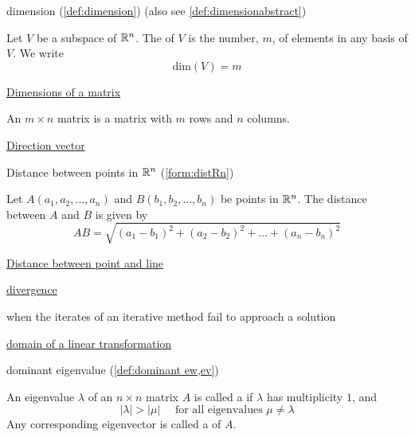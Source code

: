 \documentclass{ximera}
\begin{document}
dimension (\ref{def:dimension}) (also see \ref{def:dimensionabstract})
\begin{expandable}
    Let $V$ be a subspace of $\mathbb{R}^n$.  The  of $V$ is the number, $m$, of elements in any basis of $V$.  We write
$$\mbox{dim}(V)=m$$
\end{expandable}

\href{https://ximera.osu.edu/oerlinalg/LinearAlgebra/RRN-0010/main}{Dimensions of a matrix}
\begin{expandable}
    An $m \times n$ matrix is a matrix with $m$ rows and $n$ columns.
\end{expandable}

\href{https://ximera.osu.edu/oerlinalg/LinearAlgebra/RRN-0020/main}{Direction vector}

Distance between points in $\mathbb{R}^n$ (\ref{form:distRn})
\begin{expandable}
Let $A(a_1, a_2,\ldots ,a_n)$ and $B(b_1, b_2,\ldots ,b_n)$ be points in $\mathbb{R}^n$.  The distance between $A$ and $B$ is given by
$$AB=\sqrt{(a_1-b_1)^2+(a_2-b_2)^2+\ldots +(a_n-b_n)^2}$$
\end{expandable}

\href{https://ximera.osu.edu/oerlinalg/LinearAlgebra/VEC-0070/main}{Distance between point and line}

\href{https://ximera.osu.edu/oerlinalg/LinearAlgebra/SYS-0040/main}{divergence}
\begin{expandable}
    when the iterates of an iterative method fail to approach a solution
\end{expandable}

\href{https://ximera.osu.edu/oerlinalg/LinearAlgebra/LTR-0010/main}{domain of a linear transformation} 

dominant eigenvalue (\ref{def:dominant ew,ev})
\begin{expandable}
    An eigenvalue $\lambda$ of an $n \times n$ matrix $A$ is called a  if $\lambda$ has multiplicity $1$, and
\begin{equation*}
|\lambda| > |\mu| \quad \mbox{ for all eigenvalues } \mu \neq \lambda
\end{equation*}
Any corresponding eigenvector is called a  of $A$.
\end{expandable}
\end{document}
